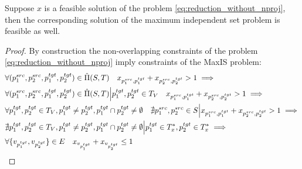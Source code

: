 \begin{lemma} \label{lemma:ilp_f_implies_maxis}
    Suppose \( x \) is a feasible solution of the problem \eqref{eq:reduction_without_nproj}, then
    the corresponding solution of the maximum independent set problem is feasible as well.
\end{lemma}
\begin{proof} By construction the non-overlapping constraints of the problem \eqref{eq:reduction_without_nproj}
    imply constraints of the MaxIS problem:
    \begin{align*}
         & \forall (p_1^{src}, p_2^{src}, p_1^{tgt}, p_2^{tgt}) \in \hat{\Pi}(S, T) \quad
        x_{p_1^{src}, p_1^{tgt}} + x_{p_2^{src}, p_2^{tgt}} > 1 \implies                                                     \\
         & \forall (p_1^{src}, p_2^{src}, p_1^{tgt}, p_2^{tgt}) \in \hat{\Pi}(S, T) \Big| p_1^{tgt}, p_2^{tgt} \in T_V \quad
        x_{p_1^{src}, p_1^{tgt}} + x_{p_2^{src}, p_2^{tgt}} > 1 \implies                                                     \\
         & \forall p_1^{tgt}, p_2^{tgt} \in T_V, p_1^{tgt} \neq p_2^{tgt}, p_1^{tgt} \cap p_2^{tgt} \neq \emptyset
        \quad \nexists p_1^{src}, p_2^{src} \in S \Big|
        x_{p_1^{src}, p_1^{tgt}} + x_{p_2^{src}, p_2^{tgt}} > 1 \implies                                                     \\
         & \nexists p_1^{tgt}, p_2^{tgt} \in T_V, p_1^{tgt} \neq p_2^{tgt}, p_1^{tgt} \cap p_2^{tgt} \neq \emptyset \Big|
        p_1^{tgt} \in T^*_x, p_2^{tgt} \in T^*_x \implies                                                                    \\
         & \forall \{ v_{p_1^{tgt}}, v_{p_2^{tgt}} \} \in E \quad x_{v_{p_1^{tgt}}} + x_{v_{p_2^{tgt}}}\leq 1
    \end{align*}
\end{proof}

